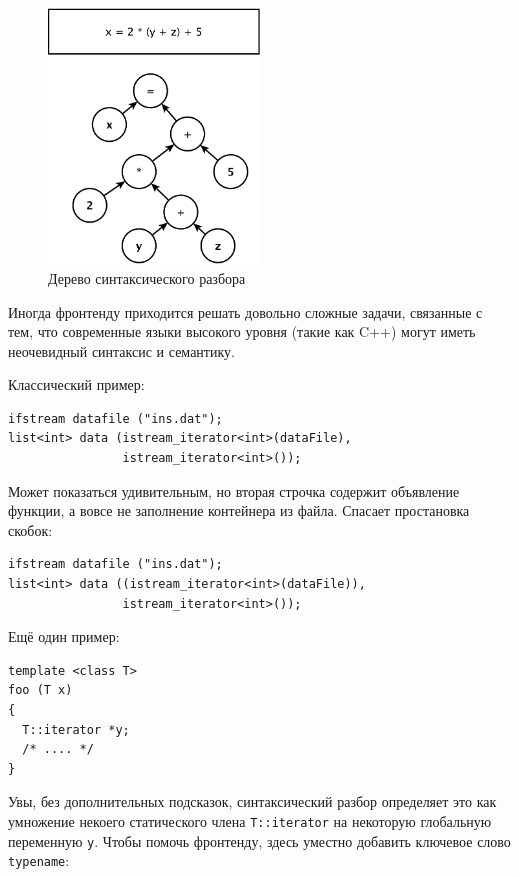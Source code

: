 \documentclass[a4paper,12pt,oneside]{article}
\begin{document}
\begin{figure}[ht]
\centering
\includegraphics[width=0.5\textwidth]{illustrations/ast-example-crop.pdf}
\caption{Дерево синтаксического разбора}
\label{fig:ast_scheme}
\end{figure}

Иногда фронтенду приходится решать довольно сложные задачи, связанные с тем, что современные языки высокого уровня (такие как C++) могут иметь неочевидный синтаксис и семантику.

Классический пример:

\begin{lstlisting}
ifstream datafile ("ins.dat");
list<int> data (istream_iterator<int>(dataFile),
                istream_iterator<int>());
\end{lstlisting}

Может показаться удивительным, но вторая строчка содержит объявление функции, а вовсе не заполнение контейнера из файла. Спасает простановка скобок:

\begin{lstlisting}
ifstream datafile ("ins.dat");
list<int> data ((istream_iterator<int>(dataFile)),
                istream_iterator<int>());
\end{lstlisting}

Ещё один пример:

\begin{lstlisting}
template <class T>
foo (T x)
{
  T::iterator *y;
  /* .... */
}
\end{lstlisting}

Увы, без дополнительных подсказок, синтаксический разбор определяет это как умножение некоего статического члена \lstinline!T::iterator! на некоторую глобальную переменную \lstinline!y!. Чтобы помочь фронтенду, здесь уместно добавить ключевое слово \lstinline!typename!:
\end{document}
